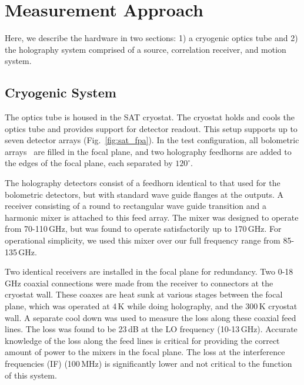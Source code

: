\section{Measurement Approach}
\label{sec:satot_meas_method}
Here, we describe the hardware in two sections: 1) a cryogenic optics tube and 2) the holography system comprised of a source, correlation receiver, and motion system.
\subsection{Cryogenic System}
\label{sec:sat_cryo_rec}
The optics tube is housed in the SAT cryostat\cite{2020SPIE11445E7LK}.  The cryostat holds and cools the optics tube and provides support for detector readout.  This setup supports up to seven detector arrays (Fig.~\ref{fig:sat_fpa}).   In the test configuration, all bolometric arrays~\cite{2022arXiv220104507H} are filled in the focal plane, and two holography feedhorns are added to the edges of the focal plane, each separated by $120^{\circ}$.

The holography detectors consist of a feedhorn  identical to that used for the bolometric detectors, but with standard wave guide flanges at the outputs. A receiver consisting of a round to rectangular wave guide transition and a harmonic mixer is attached to this feed array.  The mixer was designed to operate from 70-110\,GHz, but was found to operate satisfactorily up to 170\,GHz. For operational simplicity, we used this mixer over our full frequency range from 85-135\,GHz.

Two identical receivers are installed in the focal plane for redundancy.  Two 0-18\,GHz coaxial connections were made from the receiver to connectors at the cryostat wall.  These coaxes are heat sunk at various stages between the focal plane, which was operated at 4\,K while doing holography, and the 300\,K cryostat wall.  A separate cool down was used to measure the loss along these coaxial feed lines.  The loss  was found to be 23\,dB at the LO frequency (10-13\,GHz).  Accurate knowledge of the loss along the feed lines is critical for providing the correct amount of power to the mixers in the focal plane.  The loss at the interference frequencies (IF) (100\,MHz) is significantly lower and not critical to the function of this system.


